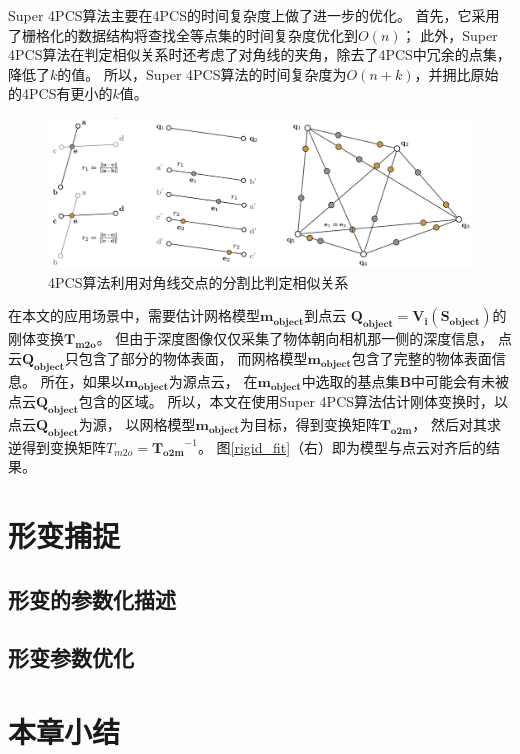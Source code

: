 Super 4PCS算法主要在4PCS的时间复杂度上做了进一步的优化。
首先，它采用了栅格化的数据结构将查找全等点集的时间复杂度优化到$O(n)$；
此外，Super 4PCS算法在判定相似关系时还考虑了对角线的夹角，除去了4PCS中冗余的点集，降低了$k$的值。
所以，Super 4PCS算法的时间复杂度为$O(n+k)$，并拥比原始的4PCS有更小的$k$值。
\begin{figure}
    \centering
    \includegraphics[width = \textwidth]{./Pictures/4PCS.png}
    \caption{4PCS算法利用对角线交点的分割比判定相似关系}
    \label{4pcs}
\end{figure}

在本文的应用场景中，需要估计网格模型$\bm{m_{object}}$到点云
$\bm{Q_{object}} = \bm{V_i}(\bm{S_{object}})$的刚体变换$\bm{T_{m2o}}$。
但由于深度图像仅仅采集了物体朝向相机那一侧的深度信息，
点云$\bm{Q_{object}}$只包含了部分的物体表面，
而网格模型$\bm{m_{object}}$包含了完整的物体表面信息。
所在，如果以$\bm{m_{object}}$为源点云，
在$\bm{m_{object}}$中选取的基点集$\bm{B}$中可能会有未被点云$\bm{Q_{object}}$包含的区域。
所以，本文在使用Super 4PCS算法估计刚体变换时，以点云$\bm{Q_{object}}$为源，
以网格模型$\bm{m_{object}}$为目标，得到变换矩阵$\bm{T_{o2m}}$，
然后对其求逆得到变换矩阵${T_{m2o}=\bm{T_{o2m}}}^{-1}$。
图\ref{rigid_fit}（右）即为模型与点云对齐后的结果。

\section{形变捕捉}
\subsection{形变的参数化描述}
\subsection{形变参数优化}

\section{本章小结}